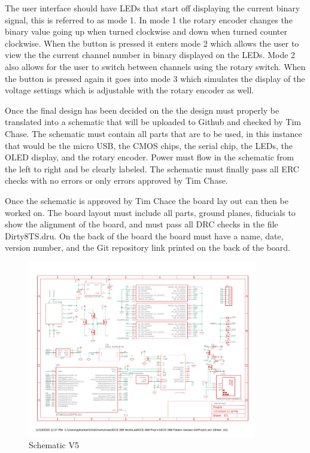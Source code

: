 \documentclass[12pt]{article}
\begin{document}
        \par The user interface should have LEDs that start off displaying the current binary signal, this is referred to as mode 1. In mode 1 the rotary encoder changes the binary value going up when turned clockwise and down when turned counter clockwise. When the button is pressed it enters mode 2 which allows the user to view the the current channel number in binary displayed on the LEDs. Mode 2 also allows for the user to switch between channels using the rotary switch. When the button is pressed again it goes into mode 3 which simulates the display of the voltage settings which is adjustable with the rotary encoder as well.
        \par Once the final design has been decided on the the design must properly be translated into a schematic that will be uploaded to Github and checked by Tim Chase. The schematic must contain all parts that are to be used, in this instance that would be the micro USB, the CMOS chips, the serial chip, the LEDs, the OLED display, and the rotary encoder. Power must flow in the schematic from the left to right and be clearly labeled. The schematic must finally pass all ERC checks with no errors or only errors approved by Tim Chase. 
        \par Once the schematic is approved by Tim Chace the board lay out can then be worked on. The board layout must include all parts, ground planes, fiducials to show the alignment of the board, and must pass all DRC checks in the file Dirty8TS.dru. On the back of the board the board must have a name, date, version number, and the Git repository link printed on the back of the board.

        \begin{figure}[htp]
            \centering
            \includegraphics[width=10cm]{ProjV5.pdf}
            \caption{Schematic V5}
        \end{figure}
        
\end{document}
